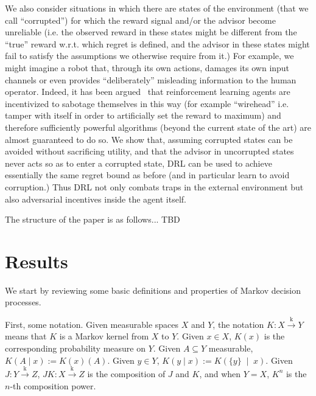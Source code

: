 \documentclass[11pt]{article}
\theoremstyle{definition}
\theoremstyle{plain}
\newcommand{\APM}[2]{\left(#1\;\middle\vert\;#2\right)}
\newcommand{\K}{\xrightarrow{\text{k}}}
\begin{document}
We also consider situations in which there are states of the environment (that we call \enquote{corrupted}) for which the reward signal and/or the advisor become unreliable (i.e. the observed reward in these states might be different from the \enquote{true} reward w.r.t. which regret is defined, and the advisor in these states might fail to satisfy the assumptions we otherwise require from it.) For example, we might imagine a robot that, through its own actions, damages its own input channels or even provides \enquote{deliberately} misleading information to the human operator. Indeed, it has been argued~\cite{TBD} that reinforcement learning agents are incentivized to sabotage themselves in this way (for example \enquote{wirehead} i.e. tamper with itself in order to artificially set the reward to maximum) and therefore sufficiently powerful algorithms (beyond the current state of the art) are almost guaranteed to do so. We show that, assuming corrupted states can be avoided without sacrificing utility, and that the advisor in uncorrupted states never acts so as to enter a corrupted state, DRL can be used to achieve essentially the same regret bound as before (and in particular learn to avoid corruption.) Thus DRL not only combats traps in the external environment but also adversarial incentives inside the agent itself.

The structure of the paper is as follows... TBD

\section{Results}

We start by reviewing some basic definitions and properties of Markov decision processes. 

First, some notation. Given measurable spaces $X$ and $Y$, the notation $K: X \K Y$ means that $K$ is a Markov kernel from $X$ to $Y$. Given $x \in X$, $K(x)$ is the corresponding probability measure on $Y$. Given $A \subseteq Y$ measurable, $K(A \mid x) := K(x)(A)$. Given $y \in Y$, $K(y \mid x):=K\APM{\{y\}}{x}$. Given $J: Y \K Z$, $JK: X \K Z$ is the composition of $J$ and $K$, and when $Y = X$, $K^n$ is the $n$-th composition power.
\end{document}
